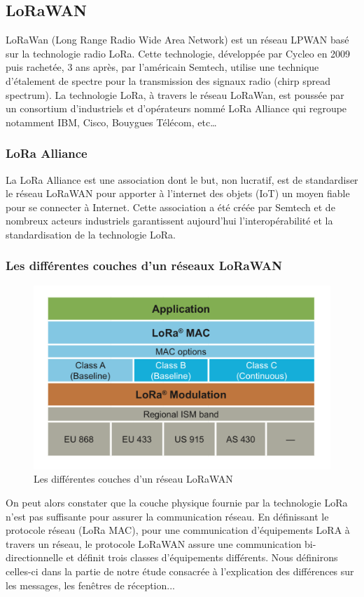 \documentclass[11pt]{article}
\begin{document}
\subsection{LoRaWAN}
LoRaWan (Long Range Radio Wide Area Network) est un réseau LPWAN basé sur la technologie radio LoRa.
Cette technologie, développée par Cycleo en 2009 puis rachetée, 3 ans après, par l'américain Semtech, utilise une technique d'étalement de spectre pour la transmission des signaux radio (chirp spread spectrum). 
La technologie LoRa, à travers le réseau LoRaWan, est poussée par un consortium d'industriels et d'opérateurs nommé LoRa Alliance qui regroupe notamment IBM, Cisco, Bouygues Télécom, etc…
\subsubsection{LoRa Alliance}
La LoRa Alliance est une association dont le but, non lucratif, est de standardiser le réseau LoRaWAN pour apporter à l'internet des objets (IoT) un moyen fiable pour se connecter à Internet. Cette association a été créée par Semtech et de nombreux acteurs industriels garantissent aujourd'hui l'interopérabilité et la standardisation de la technologie LoRa. 







\subsubsection{Les différentes couches d'un réseaux LoRaWAN}
\begin{figure}[h!]
\centering
\includegraphics[scale=0.6]{couchelora.png}
\caption{Les différentes couches d'un réseau LoRaWAN}
\end{figure}
On peut alors constater que la couche physique fournie par la technologie LoRa n'est pas suffisante pour assurer la communication réseau. En définissant le protocole réseau (LoRa MAC), pour une communication d'équipements LoRA à travers un réseau, le protocole LoRaWAN assure une communication bi-directionnelle et définit trois classes d'équipements différents. Nous définirons celles-ci dans la partie de notre étude consacrée à l'explication des différences sur les messages, les fenêtres de réception...
\newpage
\end{document}
